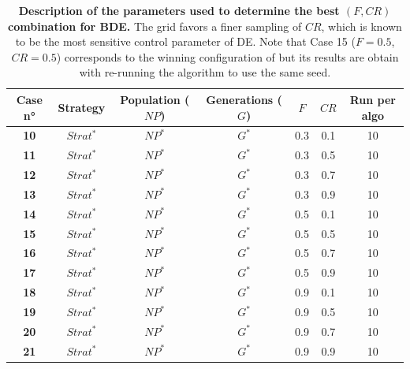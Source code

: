 \documentclass[12pt, openany]{article}
\begin{document}
\begin{table}[H]
    \centering
    \renewcommand{\arraystretch}{1.5}
    \begin{tabular}{|c|c|c|c|c|c|c|}
        \hline 
        \textbf{Case n°} & \textbf{Strategy} & \textbf{Population ($NP$)} & \textbf{Generations ($G$)} & $F$ & $CR$ & \textbf{Run per algo} \\ \hline

        \textbf{10} & $Strat^*$ & $NP^*$ & $G^*$ & 0.3 & 0.1 & 10 \\ \hdashline
        \textbf{11} & $Strat^*$ & $NP^*$ & $G^*$ & 0.3 & 0.5 & 10 \\ \hdashline
        \textbf{12} & $Strat^*$ & $NP^*$ & $G^*$ & 0.3 & 0.7 & 10 \\ \hdashline
        \textbf{13} & $Strat^*$ & $NP^*$ & $G^*$ & 0.3 & 0.9 & 10 \\
        \hline
        \textbf{14} & $Strat^*$ & $NP^*$ & $G^*$ & 0.5 & 0.1 & 10 \\ \hdashline
        \textbf{15} & $Strat^*$ & $NP^*$ & $G^*$ & 0.5 & 0.5 & 10 \\ \hdashline
        \textbf{16} & $Strat^*$ & $NP^*$ & $G^*$ & 0.5 & 0.7 & 10 \\ \hdashline
        \textbf{17} & $Strat^*$ & $NP^*$ & $G^*$ & 0.5 & 0.9 & 10 \\
        \hline
        \textbf{18} & $Strat^*$ & $NP^*$ & $G^*$ & 0.9 & 0.1 & 10 \\ \hdashline
        \textbf{19} & $Strat^*$ & $NP^*$ & $G^*$ & 0.9 & 0.5 & 10 \\ \hdashline
        \textbf{20} & $Strat^*$ & $NP^*$ & $G^*$ & 0.9 & 0.7 & 10 \\ \hdashline
        \textbf{21} & $Strat^*$ & $NP^*$ & $G^*$ & 0.9 & 0.9 & 10 \\ 
        \hline
    \end{tabular}
    \caption{\textbf{Description of the parameters used to determine the best $(F, CR)$ combination for BDE.} The grid favors a finer sampling of $CR$, which is known to be the most sensitive control parameter of DE. Note that Case 15 ($F=0.5$, $CR=0.5$) corresponds to the winning configuration of  but its results are obtain with re-running the algorithm to use the same seed.}
    \label{tab:Cases_Determine_BDE_F_CR}
\end{table}

\label{sec:cases_amde}
\end{document}
